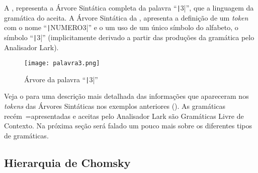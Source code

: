 A ,
representa a Árvore Sintática completa da palavra ``\texttt|3|'',
que a linguagem da gramática do  aceita.
A Árvore Sintática da ,
apresenta a definição de um \textit{token} com o nome ``\texttt|NUMERO3|'' e
o um uso de um único símbolo do alfabeto,
o símbolo ``\texttt|3|'' (implicitamente derivado a partir das produções da gramática pelo Analisador Lark).
\begin{figure}[H]
\caption[Árvore da palavra ``3'']{Árvore da palavra ``\texttt|3|''}
\label{figure:palavra3}
\centering
\texttt{[image: palavra3.png]}
\end{figure}

Veja o  para uma descrição mais detalhada das informações que apareceram nos \textit{tokens} das Árvores Sintáticas nos exemplos anteriores ().
As gramáticas recém~=apresentadas e
aceitas pelo Analisador Lark são Gramáticas Livre de Contexto.
Na próxima seção será falado um pouco mais sobre os diferentes tipos de gramáticas.


\subsection{Hierarquia de Chomsky}
\label{section:sectionHierarquiaDeChomsky}

